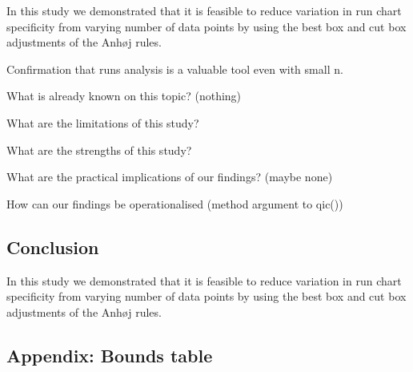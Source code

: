 In this study we demonstrated that it is feasible to reduce variation in
run chart specificity from varying number of data points by using the
best box and cut box adjustments of the Anhøj rules.

Confirmation that runs analysis is a valuable tool even with small n.

What is already known on this topic? (nothing)

What are the limitations of this study?

What are the strengths of this study?

What are the practical implications of our findings? (maybe none)

How can our findings be operationalised (method argument to qic())

\hypertarget{conclusion}{%
\subsection{Conclusion}\label{conclusion}}

In this study we demonstrated that it is feasible to reduce variation in
run chart specificity from varying number of data points by using the
best box and cut box adjustments of the Anhøj rules.



\hypertarget{appendix-bounds-table}{%
\subsection{Appendix: Bounds table}\label{appendix-bounds-table}}

